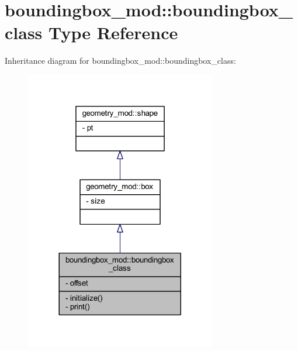 \hypertarget{structboundingbox__mod_1_1boundingbox__class}{}\section{boundingbox\+\_\+mod\+:\+:boundingbox\+\_\+class Type Reference}
\label{structboundingbox__mod_1_1boundingbox__class}


Inheritance diagram for boundingbox\+\_\+mod\+:\+:boundingbox\+\_\+class\+:\nopagebreak
\begin{figure}[H]
\begin{center}
\leavevmode
\includegraphics[width=236pt]{structboundingbox__mod_1_1boundingbox__class__inherit__graph}
\end{center}
\end{figure}



